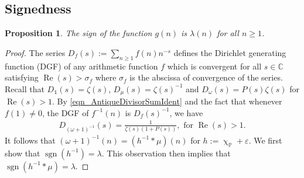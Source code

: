\documentclass[11pt,reqno,a4letter]{article}
\numberwithin{equation}{section}
\numberwithin{figure}{section}
\numberwithin{table}{section}
\renewcommand{\chi}{\upchi}
\theoremstyle{plain}
\newtheorem{prop}[theorem]{Proposition}
\numberwithin{theorem}{section}
\theoremstyle{definition}
\renewcommand{\Re}{\operatorname{Re}}
\begin{document}
\subsection{Signedness}
\label{Section_PrelimProofs_Config} 
\label{subSection_ProofOfSignednessOfgInvn_v1} 

\begin{prop}
\label{prop_SignageDirInvsOfPosBddArithmeticFuncs_v1} 
The sign of the function $g(n)$ is $\lambda(n)$ for all $n \geq 1$. 
\end{prop} 
\begin{proof} 
The series $D_f(s) := \sum_{n \geq 1} f(n) n^{-s}$ defines the 
Dirichlet generating function (DGF) of any 
arithmetic function $f$ which is convergent for all $s \in \mathbb{C}$ satisfying 
$\Re(s) > \sigma_f$ where $\sigma_f$ is the abscissa of convergence of the series. 
Recall that $D_{\mathds{1}}(s) = \zeta(s)$, $D_{\mu}(s) = \zeta(s)^{-1}$ and 
$D_{\omega}(s) = P(s) \zeta(s)$ for $\Re(s) > 1$. 
By \eqref{eqn_AntiqueDivisorSumIdent} and the fact that whenever $f(1) \neq 0$, 
the DGF of $f^{-1}(n)$ is $D_f(s)^{-1}$, we have 
\begin{align} 
\label{eqn_DGF_of_gInvn} 
D_{(\omega+1)^{-1}}(s) = \frac{1}{\zeta(s) (1+P(s))}, \text{ for } \Re(s) > 1. 
\end{align} 
It follows that $(\omega + 1)^{-1}(n) = (h^{-1} \ast \mu)(n)$ for 
$h := \chi_{\mathbb{P}} + \varepsilon$. 
We first show that $\operatorname{sgn}(h^{-1}) = \lambda$. 
This observation then implies that 
$\operatorname{sgn}(h^{-1} \ast \mu) = \lambda$. 


\end{proof}
\end{document}
